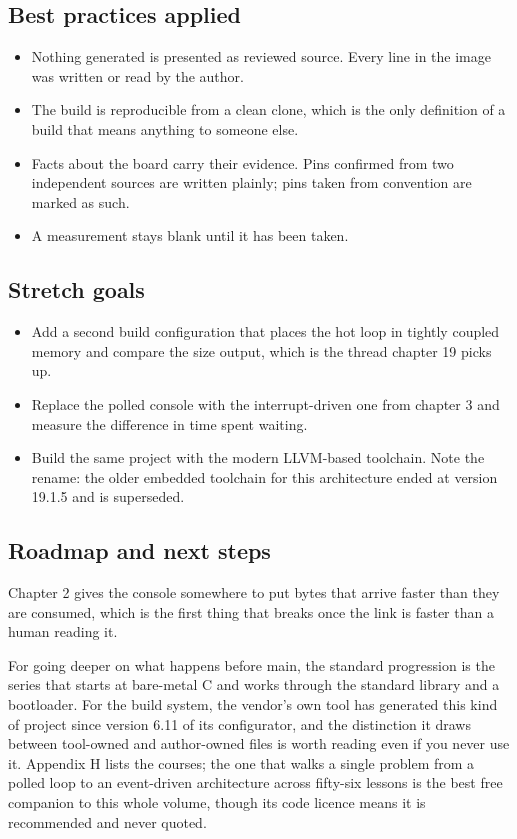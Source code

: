 \subsection*{Best practices applied}

\begin{itemize}
\item Nothing generated is presented as reviewed source. Every line in the image
was written or read by the author.
\item The build is reproducible from a clean clone, which is the only definition
of a build that means anything to someone else.
\item Facts about the board carry their evidence. Pins confirmed from two
independent sources are written plainly; pins taken from convention are marked
as such.
\item A measurement stays blank until it has been taken.
\end{itemize}

\subsection*{Stretch goals}

\begin{itemize}
\item Add a second build configuration that places the hot loop in
tightly coupled memory and compare the size output, which is the thread chapter
19 picks up.
\item Replace the polled console with the interrupt-driven one from chapter 3
and measure the difference in time spent waiting.
\item Build the same project with the modern LLVM-based toolchain. Note the
rename: the older embedded toolchain for this architecture ended at version
19.1.5 and is superseded.
\end{itemize}

\subsection*{Roadmap and next steps}

Chapter 2 gives the console somewhere to put bytes that arrive faster than they
are consumed, which is the first thing that breaks once the link is faster than
a human reading it.

For going deeper on what happens before main, the standard progression is the
series that starts at bare-metal C and works through the standard library and a
bootloader. For the build system, the vendor's own tool has generated this kind
of project since version 6.11 of its configurator, and the distinction it draws
between tool-owned and author-owned files is worth reading even if you never use
it. Appendix H lists the courses; the one that walks a single problem from a
polled loop to an event-driven architecture across fifty-six lessons is the best
free companion to this whole volume, though its code licence means it is
recommended and never quoted.

